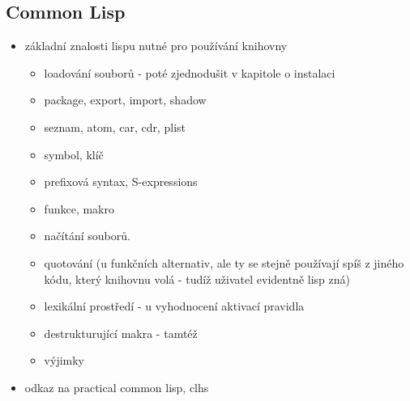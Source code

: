 \subsection{Common Lisp}
\begin{framed}
\begin{itemize}
  \item základní znalosti lispu nutné pro používání knihovny
  \begin{itemize}
    \item loadování souborů - poté zjednodušit v kapitole o instalaci
    \item package, export, import, shadow
    \item seznam, atom, car, cdr, plist
    \item symbol, klíč
    \item prefixová syntax, S-expressions
    \item funkce, makro
    \item načítání souborů.
    \item quotování (u funkčních alternativ, ale ty se stejně používají spíš z jiného
      kódu, který knihovnu volá - tudíž uživatel evidentně lisp zná)
    \item lexikální prostředí - u vyhodnocení aktivací pravidla
    \item destrukturující makra - tamtéž
    \item výjimky
  \end{itemize}
  \item odkaz na practical common lisp, clhs
\end{itemize}
\end{framed}
